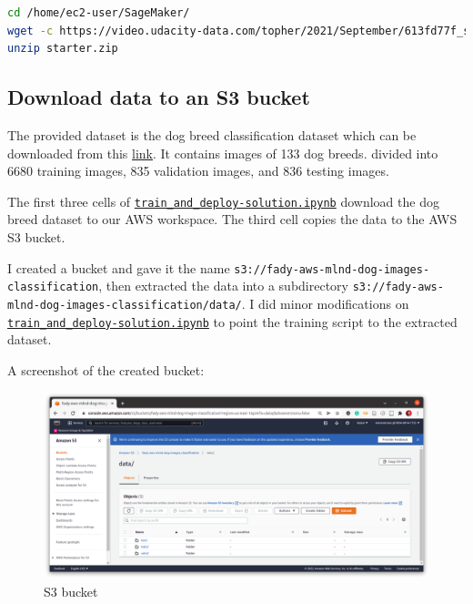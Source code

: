 \documentclass[a4paper
]{article}
\begin{document}
\begin{lstlisting}[language=bash]
cd /home/ec2-user/SageMaker/
wget -c https://video.udacity-data.com/topher/2021/September/613fd77f_starter/starter.zip
unzip starter.zip
\end{lstlisting}

\hypertarget{download-data-to-an-s3-bucket}{%
\subsection{Download data to an S3
bucket}\label{download-data-to-an-s3-bucket}}

The provided dataset is the dog breed classification dataset which can
be downloaded from this
\href{https://s3-us-west-1.amazonaws.com/udacity-aind/dog-project/dogImages.zip}{link}.
It contains images of 133 dog breeds. divided into 6680 training images,
835 validation images, and 836 testing images.

The first three cells of
\href{https://github.com/FadyMorris/udacity-AWS-ml-engineer-nanodegree/tree/main/projects/04_operationalizing-an-aws-ml-project/train_and_deploy-solution.ipynb}{\texttt{train\_and\_deploy-solution.ipynb}}
download the dog breed dataset to our AWS workspace. The third cell
copies the data to the AWS S3 bucket.

I created a bucket and gave it the name
\texttt{s3://fady-aws-mlnd-dog-images-classification}, then extracted
the data into a subdirectory
\texttt{s3://fady-aws-mlnd-dog-images-classification/data/}. I did minor
modifications on
\href{https://github.com/FadyMorris/udacity-AWS-ml-engineer-nanodegree/tree/main/projects/04_operationalizing-an-aws-ml-project/train_and_deploy-solution.ipynb}{\texttt{train\_and\_deploy-solution.ipynb}}
to point the training script to the extracted dataset.

A screenshot of the created bucket:

\begin{figure}[H]
\centering
\includegraphics{../screenshots/01-b_s3-bucket.png}
\caption{S3 bucket}
\end{figure}
\end{document}
